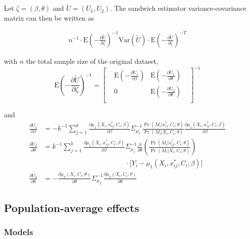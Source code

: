 \documentclass[]{article}
\begin{document}
Let $\zeta = (\beta, \theta)$ and $\tilde U = (U_1, U_2)$. The sandwich estimator variance-covariance matrix can then be written as

\begin{eqnarray*}
\displaystyle n^{-1}\cdot\mbox{E}\left(-\frac{\partial \tilde U}{\partial \zeta}\right)^{-1} \mbox{Var}(\tilde U) \cdot \mbox{E}\left(-\frac{\partial \tilde U}{\partial \zeta}\right)^{-T}
\end{eqnarray*}

\noindent with $n$ the total sample size of the original dataset, 
\[
\renewcommand\arraystretch{2.5}
\displaystyle \mbox{E}\left(-\frac{\partial \tilde U}{\partial \zeta}\right)^{-1} = 
\begin{bmatrix}
& \displaystyle\mbox{E}\left(-\frac{\partial U_1}{\partial \beta}\right) & \displaystyle\mbox{E}\left(-\frac{\partial U_1}{\partial \theta}\right) &\\
& 0 & \displaystyle\mbox{E}\left(-\frac{\partial U_2}{\partial \theta}\right) &\\
\end{bmatrix}^{-1}
\]

\noindent and
\begin{align*}
\displaystyle \frac{\partial U_1}{\partial \beta} &= - k^{-1} \sum_{j=1}^{k} \frac{\partial \mu_1(X_i,x^*_{ij},C_i;\beta)}{\partial \beta} \Sigma_{\mu_1}^{-1} \frac{\Pr(M_i\vert x^*_{ij},C_i;\theta)}{\Pr(M_i\vert X_i,C_i;\theta)} \frac{\partial \mu_1(X_i,x^*_{ij},C_i;\beta)}{\partial \beta}\\[0.6em]
\displaystyle \frac{\partial U_1}{\partial \theta} &= k^{-1} \sum_{j=1}^{k} \frac{\partial \mu_1(X_i,x^*_{ij},C_i;\beta)}{\partial \beta} \Sigma_{\mu_1}^{-1} \frac{\partial}{\partial \theta}\left(\frac{\Pr(M_i\vert x^*_{ij},C_i;\theta)}{\Pr(M_i\vert X_i,C_i;\theta)}\right)\\[-0.6em] & \qquad \qquad \qquad \qquad \qquad \qquad \cdot \big[ Y_i - \mu_1(X_i,x^*_{ij},C_i;\beta) \big]\\[0.6em]
\displaystyle \frac{\partial U_2}{\partial \theta} &= - \frac{\partial \mu_2(X_i,C_i;\theta)}{\partial \theta} \Sigma_{\mu_2}^{-1} \frac{\partial \mu_2(X_i,C_i;\theta)}{\partial \theta}
\end{align*}

\subsection*{Population-average effects}

\subsubsection*{Models}
\end{document}
